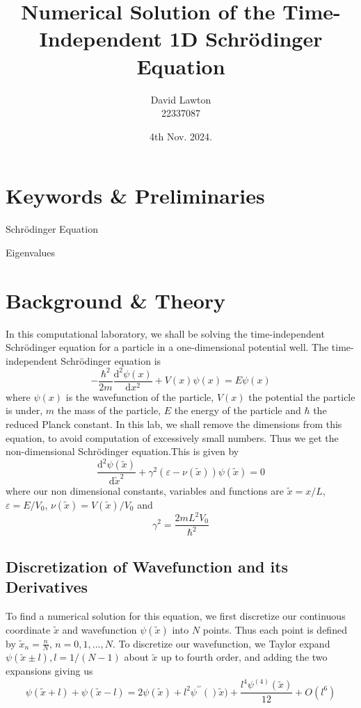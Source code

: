 \documentclass{article}
\title{Numerical Solution of the Time-Independent 1D Schr\"{o}dinger Equation}
\author{David Lawton\\
        22337087}
\date{4th Nov. 2024.}
\theoremstyle{definition}
\theoremstyle{remark}
\begin{document}
\maketitle

\tableofcontents
{}
\begin{abstract}

\end{abstract}

\section{Keywords \& Preliminaries}
\begin{list}{Keywords}{0.5cm}
    \item Schr\"{o}dinger Equation
    \item Eigenvalues
\end{list}


\section{Background \& Theory}
In this computational laboratory, we shall be solving the time-independent Schr\"{o}dinger equation for a particle in a one-dimensional potential well. The time-independent Schr\"{o}dinger equation is 
\begin{equation}
    -\frac{\hbar^2}{2m}\frac{\mathrm{d}^2\psi(x)}{\mathrm{d}x^2} + V(x)\psi(x) = E\psi(x)
\end{equation}
where $\psi(x)$ is the wavefunction of the particle, $V(x)$ the potential the particle is under, $m$ the mass of the particle, $E$ the energy of the particle and $\hbar$ the reduced Planck constant. In this lab, we shall remove the dimensions from this equation, to avoid computation of excessively small numbers. Thus we get the non-dimensional Schr\"{o}dinger equation.This is given by
\begin{equation}
    \frac{\mathrm{d}^2\psi(\tilde{x})}{\mathrm{d}\tilde{x}^2} + \gamma^2(\varepsilon-\nu(\tilde{x}))\psi(\tilde{x}) = 0
\end{equation}
where our non dimensional constants, variables and functions are $\tilde{x} = x/L$, $\varepsilon = E/V_0$, $\nu(\tilde{x}) = V(\tilde{x})/V_0$ and 
\begin{equation}
    \gamma^2 = \frac{2mL^2V_0}{\hbar^2}
\end{equation}
\subsection{Discretization of Wavefunction and its Derivatives}
To find a numerical solution for this equation, we first discretize our continuous coordinate $\tilde{x}$ and wavefunction $\psi(\tilde{x})$ into $N$ points. Thus each point is defined by $\tilde{x}_n = \frac{n}{N}$, $n = 0, 1, ..., N$. To discretize our wavefunction, we Taylor expand $\psi(\tilde{x}\pm l), l=1/(N-1)$ about $\tilde{x}$ up to fourth order, and adding the two expansions giving us
\begin{equation}
    \psi(\tilde{x}+l) + \psi(\tilde{x}-l) = 2\psi(\tilde{x}) + l^2\psi^{\prime\prime}()\tilde{x}) + \frac{l^4\psi^{(4)}(\tilde{x})}{12} + O(l^6)
\end{equation}
\end{document}
